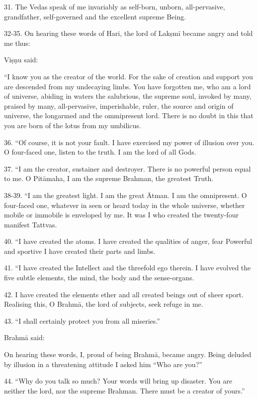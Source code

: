 31. The Vedas speak of me invariably as self-born, unborn, all-pervasive,
grandfather, self-governed and the excellent supreme Being.

32-35. On hearing these words of Hari, the lord of Lakṣmī became angry and told
me thus:

Viṣṇu said:

“I know you as the creator of the world. For the sake of creation and support
you are descended from my undecaying limbs. You have forgotten me, who am a lord
of universe, abiding in waters the salubrious, the supreme soul, invoked by many,
praised by many, all-pervasive, imperishable, ruler, the source and origin of
universe, the longarmed and the ommipresent lord. There is no doubt in this that
you are born of the lotus from my umbilicus.

36. “Of course, it is not your fault. I have exercised my power of illusion over
you. O four-faced one, listen to the truth. I am the lord of all Gods.

37. “I am the creator, sustainer and destroyer. There is no powerful person
equal to me. O Pitāmaha, I am the supreme Brahman, the greatest Truth.

38-39. “I am the greatest light. I am the great Ātman. I am the omnipresent. O
four-faced one, whatever in seen or heard today in the whole universe, whether
mobile or immobile is enveloped by me. It was I who created the twenty-four
manifest Tattvas.

40. “I have created the atoms. I have created the qualities of anger, fear \etc
Powerful and sportive I have created their parts and limbs.

41. “I have created the Intellect and the threefold ego therein. I have evolved
the five subtle elements, the mind, the body and the sense-organs.

42. I have created the elements ether \etc and all created beings out of sheer
sport. Realising this, O Brahmā, the lord of subjects, seek refuge in me.

43. “I shall certainly protect you from all miseries.”

Brahmā said:

On hearing these words, I, proud of being Brahmā, became angry. Being deluded by
illusion in a threatening attitude I asked him “Who are you?”

44. “Why do you talk so much? Your words will bring up disaster. You are neither
the lord, nor the supreme Brahman. There must be a creator of yours.”

